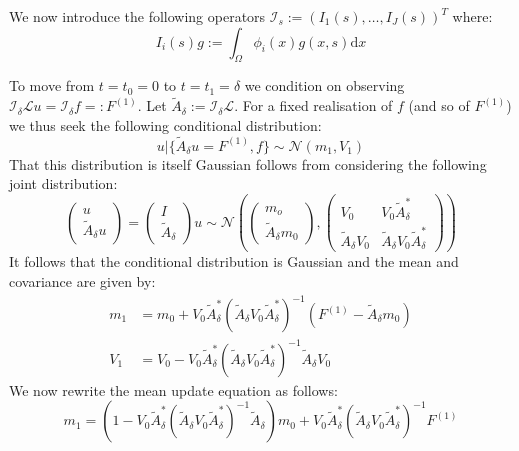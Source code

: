\documentclass{article}
\theoremstyle{definition}
\theoremstyle{remark}
\theoremstyle{remark}
\begin{document}
\noindent We now introduce the following operators $\mathcal{I}_{s}:=(I_{1}(s),\dots,I_{J}(s))^{T}$ where:
\begin{equation}
    I_{i}(s)g:=\int_{\Omega}\phi_{i}(x)g(x,s)\mathrm{d}x
\end{equation}

\noindent To move from $t=t_{0}=0$ to $t=t_{1}=\delta$ we condition on observing $\mathcal{I}_{\delta}\mathcal{L}u=\mathcal{I}_{\delta}f=:F^{(1)}$. Let $\tilde{A}_{\delta}:=\mathcal{I}_{\delta}\mathcal{L}$. For a fixed realisation of $f$ (and so of $F^{(1)}$) we thus seek the following conditional distribution:
\begin{equation}
    u|\{\tilde{A}_{\delta}u=F^{(1)},f\}\sim\mathcal{N}(m_{1},V_{1})
\end{equation}
That this distribution is itself Gaussian follows from considering the following joint distribution:
\begin{equation*}
    \left(\begin{array}{c}u \\ \tilde{A}_{\delta} u\end{array}\right)=\left(\begin{array}{c}I \\ \tilde{A}_{\delta}\end{array}\right) u \sim \mathcal{N}\left(\left(\begin{array}{c}m_{o} \\ \tilde{A}_{\delta}m_{0}\end{array}\right),\left(\begin{array}{cc}V_{0} & V_{0} \tilde{A}_{\delta}^{*} \\ \tilde{A}_{\delta}V_{0} & \tilde{A}_{\delta}V_{0} \tilde{A}_{\delta}^{*}\end{array}\right)\right)
\end{equation*}
It follows that the conditional distribution is Gaussian and the mean and covariance are given by:
\begin{align}
    m_{1}&=m_{0}+V_{0}\tilde{A}_{\delta}^{*}(\tilde{A}_{\delta}V_{0}\tilde{A}_{\delta}^{*})^{-1}(F^{(1)}-\tilde{A}_{\delta}m_{0}) \\
    V_{1}&=V_{0}-V_{0}\tilde{A}_{\delta}^{*}(\tilde{A}_{\delta}V_{0}\tilde{A}_{\delta}^{*})^{-1}\tilde{A}_{\delta}V_{0}
\end{align}
We now rewrite the mean update equation as follows:
\begin{equation}
    \label{new_method_update}
    m_{1}=\left(1-V_{0}\tilde{A}_{\delta}^{*}(\tilde{A}_{\delta}V_{0}\tilde{A}_{\delta}^{*})^{-1}\tilde{A}_{\delta}\right)m_{0}+V_{0}\tilde{A}_{\delta}^{*}(\tilde{A}_{\delta}V_{0}\tilde{A}_{\delta}^{*})^{-1}F^{(1)}
\end{equation}
\end{document}
